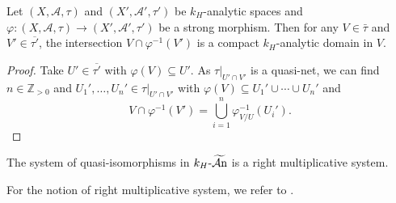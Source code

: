 \begin{lemma}\label{lma-strongmorphisminversecptanalyticdomain}
    Let $(X,\mathcal{A},\tau)$ and $(X',\mathcal{A}',\tau')$ be $k_H$-analytic spaces and $\varphi:(X,\mathcal{A},\tau)\rightarrow (X',\mathcal{A}',\tau')$ be a strong morphism. Then for any $V\in \bar{\tau}$ and $V'\in \overline{\tau'}$, the intersection $V\cap \varphi^{-1}(V')$ is a compact $k_H$-analytic domain in $V$.
\end{lemma}
\begin{proof}
    Take $U'\in \overline{\tau'}$ with $\varphi(V)\subseteq U'$. As $\tau|_{U'\cap V'}$ is a quasi-net, we can find $n\in \mathbb{Z}_{>0}$ and $U_1',\ldots,U_n'\in \tau|_{U'\cap V'}$ with $\varphi(V)\subseteq U_1'\cup \cdots \cup U_n'$ and 
    \[
        V\cap \varphi^{-1}(V')=\bigcup_{i=1}^n \varphi^{-1}_{V/U}(U_i').
    \]
\end{proof}

\begin{lemma}\label{lma-quasiisomrightmultiplicative}
    The system of quasi-isomorphisms in $k_H\text{-}\widetilde{\mathcal{A}\mathrm{n}}$ is a right multiplicative system.
\end{lemma}
For the notion of right multiplicative system, we refer to \cite[\href{https://stacks.math.columbia.edu/tag/04VC}{Tag 04VC}]{stacks-project}.

